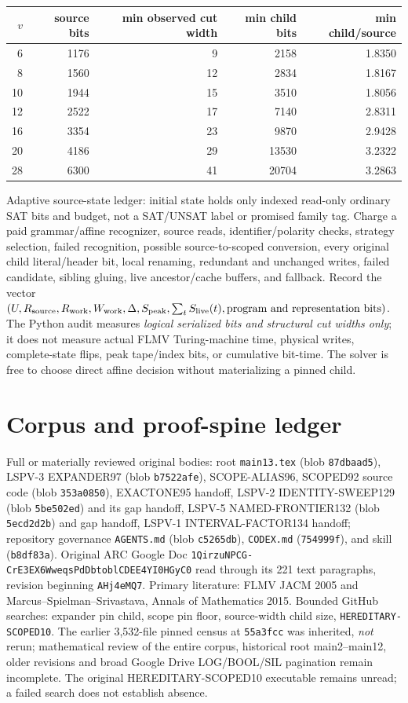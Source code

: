 \documentclass[11pt]{article}
\begin{document}
\begin{center}\small
\begin{tabular}{rrrrr}
\toprule
$v$ & source bits & min observed cut width & min child bits & min child/source\\
\midrule
6&1176&9&2158&1.8350\\
8&1560&12&2834&1.8167\\
10&1944&15&3510&1.8056\\
12&2522&17&7140&2.8311\\
16&3354&23&9870&2.9428\\
20&4186&29&13530&3.2322\\
28&6300&41&20704&3.2863\\
\bottomrule
\end{tabular}
\end{center}

Adaptive source-state ledger: initial state holds only indexed read-only ordinary SAT bits and budget, not a SAT/UNSAT label or promised family tag. Charge a paid grammar/affine recognizer, source reads, identifier/polarity checks, strategy selection, failed recognition, possible source-to-scoped conversion, every original child literal/header bit, local renaming, redundant and unchanged writes, failed candidate, sibling gluing, live ancestor/cache buffers, and fallback. Record the vector $(U,R_{\rm source},R_{\rm work},W_{\rm work},\Delta,S_{\rm peak},\sum_t S_{\rm live}(t),\text{program and representation bits})$. The Python audit measures \emph{logical serialized bits and structural cut widths only}; it does not measure actual FLMV Turing-machine time, physical writes, complete-state flips, peak tape/index bits, or cumulative bit-time. The solver is free to choose direct affine decision without materializing a pinned child.

\section{Corpus and proof-spine ledger}
Full or materially reviewed original bodies: root \texttt{main13.tex} (blob \texttt{87dbaad5}), LSPV-3 EXPANDER97 (blob \texttt{b7522afe}), SCOPE-ALIAS96, SCOPED92 source code (blob \texttt{353a0850}), EXACTONE95 handoff, LSPV-2 IDENTITY-SWEEP129 (blob \texttt{5be502ed}) and its gap handoff, LSPV-5 NAMED-FRONTIER132 (blob \texttt{5ecd2d2b}) and gap handoff, LSPV-1 INTERVAL-FACTOR134 handoff; repository governance \texttt{AGENTS.md} (blob \texttt{c5265db}), \texttt{CODEX.md} (\texttt{754999f}), and skill (\texttt{b8df83a}). Original ARC Google Doc \texttt{1QirzuNPCG-CrE3EX6WweqsPdDbtoblCDEE4YI0HGyC0} read through its 221 text paragraphs, revision beginning \texttt{AHj4eMQ7}. Primary literature: FLMV JACM 2005 and Marcus--Spielman--Srivastava, Annals of Mathematics 2015. Bounded GitHub searches: expander pin child, scope pin floor, source-width child size, \texttt{HEREDITARY-SCOPED10}. The earlier 3,532-file pinned census at \texttt{55a3fcc} was inherited, \emph{not} rerun; mathematical review of the entire corpus, historical root main2--main12, older revisions and broad Google Drive LOG/BOOL/SIL pagination remain incomplete. The original HEREDITARY-SCOPED10 executable remains unread; a failed search does not establish absence.
\end{document}
